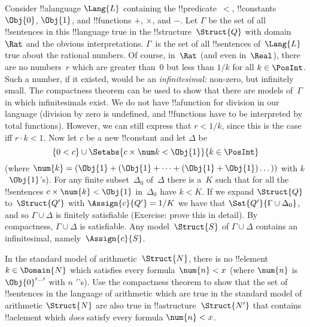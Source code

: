 \documentclass[../../../include/open-logic-section]{subfiles}
\begin{document}
{\begin{ex}
Consider !!a{language} $\Lang{L}$ containing the !!{predicate}~$<$,
!!{constant}s $\Obj{0}$, $\Obj{1}$, and !!{function}s $+$, $\times$, and
$-$. Let $\Gamma$ be the set of all !!{sentence}s in this
!!{language} true in the !!{structure}~$\Struct{Q}$ with domain~$\Rat$ and the obvious
interpretations.  $\Gamma$~is the set of all !!{sentence}s
of~$\Lang{L}$ true about the rational numbers. Of course, in~$\Rat$
(and even in~$\Real$), there are no numbers~$r$ which are greater than~$0$
but less than $1/k$ for all $k \in \PosInt$.  Such a number, if it
existed, would be an \emph{infinitesimal:} non-zero, but infinitely
small.  The compactness theorem can be used to show that there are 
models of~$\Gamma$ in which infinitesimals exist. We do not have 
!!a{function} for division in our language (division by zero is 
undefined, and !!{function}s have to be interpreted by total functions).
However, we can still express that $r < 1/k$, since this is the case iff
$r \cdot k < 1$. Now let $c$ be a new !!{constant} and let $\Delta$ be 
\[
\{0<c\}
\cup \Setabs{ c \times \num k < \Obj{1} }{k \in \PosInt}
\]
(where
$\num{k} = (\Obj{1} + (\Obj{1} + \dots + (\Obj{1} + \Obj{1})\dots))$
with $k$~$\Obj{1}$'s). For any finite subset~$\Delta_0$ of~$\Delta$
there is a~$K$ such that for all the !!{sentence}s $c \times \num{k} < \Obj{1}$ 
in~$\Delta_0$ have $k < K$. If we expand $\Struct{Q}$ to~$\Struct{Q'}$
with $\Assign{c}{Q'} = 1/K$ we have that $\Sat{Q'}{\Gamma \cup
  \Delta_0}$, and so $\Gamma \cup \Delta$ is finitely satisfiable
(Exercise: prove this in detail). By compactness, $\Gamma \cup \Delta$
is satisfiable. Any model~$\Struct{S}$ of $\Gamma \cup \Delta$
contains an infinitesimal, namely~$\Assign{c}{S}$.
\end{ex}
}{}

\begin{prob}
In the standard model of arithmetic~$\Struct{N}$, there is no
!!{element}~$k \in \Domain{N}$ which satisfies every formula~$\num{n}
< x$ (where $\num{n}$ is $\Obj{0}^{\prime\dots\prime}$ with $n$
$\prime$'s).  Use the compactness theorem to show that the set of
!!{sentence}s in the language of arithmetic which are true in the standard
model of arithmetic $\Struct{N}$ are also true in
!!a{structure}~$\Struct{N'}$ that contains !!a{element} which
\emph{does} satisfy every formula $\num{n} < x$.
\end{prob}
\tagendprob
\end{document}
